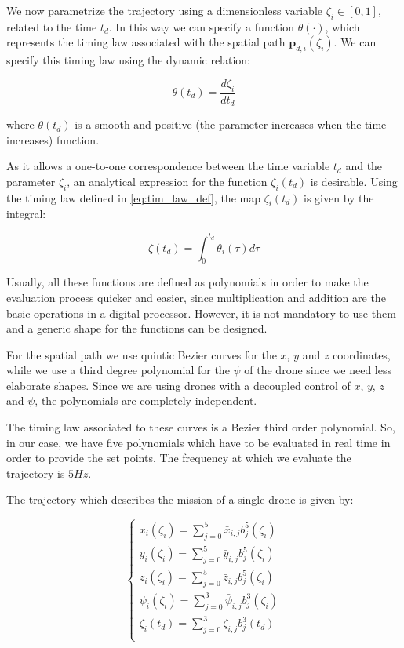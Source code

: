 We now parametrize the trajectory using a dimensionless variable $ \zeta_i \in [0,1]$,
related to the time $t_d$. In this way we can specify a function $ \theta( \cdot )$,
which represents the timing law associated with the spatial path $\bm{p}_{d,i}(\zeta_i)$.
We can specify this timing law using the dynamic relation:

\begin{equation}  \label{eq:tim_law_def}
  \theta( t_d ) = \frac{d \zeta_i}{dt_d}
\end{equation}

where $ \theta( t_d ) $ is a smooth and positive (the parameter increases when
the time increases) function.

As it allows a one-to-one correspondence between the time
variable $t_d$ and the parameter $ \zeta_i $, an analytical expression
for the function $ \zeta_i (t_d) $ is desirable.
Using the timing law defined in \eqref{eq:tim_law_def}, the map $ \zeta_i ( t_d) $
is given by the integral:

\begin{equation}  \label{eq:zeta_law_def}
  \zeta( t_d ) = \int^{t_d}_0 \theta_i(\tau) d \tau
\end{equation}

Usually, all these functions are defined as polynomials in order to make the evaluation process
quicker and easier, since multiplication and addition are the basic
operations in a digital processor. However, it is not mandatory to use them and a
generic shape for the functions can be designed.

For the spatial path we use quintic Bezier curves for the $x$, $y$ and $z$ coordinates,
while we use a third degree polynomial for the $\psi$ of the drone since we need less
elaborate shapes.
Since we are using drones with a decoupled control of $x$, $y$, $z$ and $\psi$, the
polynomials are completely independent.

The timing law associated to these curves is a Bezier third order polynomial.
So, in our case, we have five polynomials which have to be evaluated in real time
in order to provide the set points. The frequency at which we evaluate the trajectory
is $5 Hz$.

The trajectory which describes the mission of a single drone is given by:

\[
  \begin{cases}
    x_i(\zeta_i) = \sum_{j=0}^{5}{\bar{x}_{i,j} b_j^5(\zeta_i)}\\
    y_i(\zeta_i) = \sum_{j=0}^{5}{\bar{y}_{i,j} b_j^5(\zeta_i)}\\
    z_i(\zeta_i) = \sum_{j=0}^{5}{\bar{z}_{i,j} b_j^5(\zeta_i)}\\
    \psi_i(\zeta_i) = \sum_{j=0}^{3}{\bar{\psi}_{i,j} b_j^3(\zeta_i)}\\
    \zeta_i(t_d) = \sum_{j=0}^{3}{\bar{\zeta}_{i,j} b_j^3(t_d)}\\
  \end{cases}
\]

